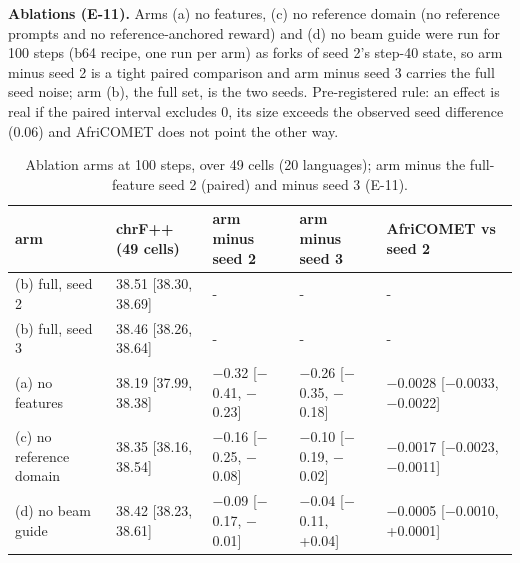\textbf{Ablations (E-11).} Arms (a) no features, (c) no reference domain (no reference prompts and no reference-anchored reward) and (d) no beam guide were run for 100 steps (b64 recipe, one run per arm) as forks of seed 2's step-40 state, so arm minus seed 2 is a tight paired comparison and arm minus seed 3 carries the full seed noise; arm (b), the full set, is the two seeds. Pre-registered rule: an effect is real if the paired interval excludes 0, its size exceeds the observed seed difference (0.06) and AfriCOMET does not point the other way. 

\begin{table}[t]
\centering\footnotesize
\setlength{\tabcolsep}{4pt}
\caption{Ablation arms at 100 steps, \chrfpp{} over 49 cells (20 languages); arm minus the full-feature seed 2 (paired) and minus seed 3 (E-11).}\label{tab:e11}
\begin{tabularx}{\linewidth}{@{}llll>{\raggedright\arraybackslash}X@{}}
\toprule
arm & chrF++ (49 cells) & arm minus seed 2 & arm minus seed 3 & AfriCOMET vs seed 2 \\
\midrule
(b) full, seed 2 & 38.51 [38.30, 38.69] & - & - & - \\
(b) full, seed 3 & 38.46 [38.26, 38.64] & - & - & - \\
(a) no features & 38.19 [37.99, 38.38] & \ensuremath{-}0.32 [\ensuremath{-}0.41, \ensuremath{-}0.23] & \ensuremath{-}0.26 [\ensuremath{-}0.35, \ensuremath{-}0.18] & \ensuremath{-}0.0028 [\ensuremath{-}0.0033, \ensuremath{-}0.0022] \\
(c) no reference domain & 38.35 [38.16, 38.54] & \ensuremath{-}0.16 [\ensuremath{-}0.25, \ensuremath{-}0.08] & \ensuremath{-}0.10 [\ensuremath{-}0.19, \ensuremath{-}0.02] & \ensuremath{-}0.0017 [\ensuremath{-}0.0023, \ensuremath{-}0.0011] \\
(d) no beam guide & 38.42 [38.23, 38.61] & \ensuremath{-}0.09 [\ensuremath{-}0.17, \ensuremath{-}0.01] & \ensuremath{-}0.04 [\ensuremath{-}0.11, +0.04] & \ensuremath{-}0.0005 [\ensuremath{-}0.0010, +0.0001] \\
\bottomrule
\end{tabularx}
\end{table}

